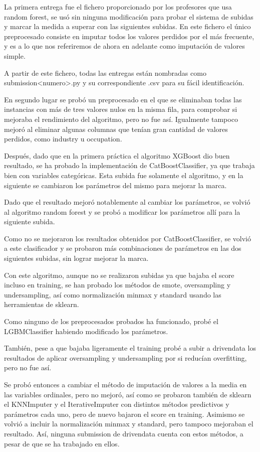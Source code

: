 \documentclass[twoside,openright,titlepage,numbers=noenddot,openany,headinclude,footinclude=true,
cleardoublepage=empty,abstractoff,BCOR=5mm,paper=a4,fontsize=12pt,main=spanish]{scrreprt}
\begin{document}
La primera entrega fue el fichero proporcionado por los profesores que usa random forest, se usó sin ninguna modificación para probar el sistema de subidas y marcar la medida a superar con las siguientes subidas. En este fichero el único preprocesado consiste en imputar todos los valores perdidos por el más frecuente, y es a lo que nos referiremos de ahora en adelante como imputación de valores simple.

A partir de este fichero, todas las entregas están nombradas como submission<numero>.py y su correspondiente .csv para su fácil identificación.

En segundo lugar se probó un preprocesado en el que se eliminaban todas las instancias con más de tres valores nulos en la misma fila, para comprobar si mejoraba el rendimiento del algoritmo, pero no fue así. Igualmente tampoco mejoró al eliminar algunas columnas que tenían gran cantidad de valores perdidos, como industry u occupation.

Después, dado que en la primera práctica el algoritmo XGBoost dio buen resultado, se ha probado la implementación de CatBoostClassifier, ya que trabaja bien con variables categóricas. Esta subida fue solamente el algoritmo, y en la siguiente se cambiaron los parámetros del mismo para mejorar la marca.

Dado que el resultado mejoró notablemente al cambiar los parámetros, se volvió al algoritmo random forest y se probó a modificar los parámetros allí para la siguiente subida.

Como no se mejoraron los resultados obtenidos por CatBoostClassifier, se volvió a este clasificador y se probaron más combinaciones de parámetros en las dos siguientes subidas, sin lograr mejorar la marca.

Con este algoritmo, aunque no se realizaron subidas ya que bajaba el score incluso en training, se han probado los métodos de smote, oversampling y undersampling, así como normalización minmax y standard usando las herramientas de sklearn.

Como ninguno de los preprocesados probados ha funcionado, probé el LGBMClassifier habiendo modificado los parámetros.

También, pese a que bajaba ligeramente el training probé a subir a drivendata los resultados de aplicar oversampling y undersampling por si reducían overfitting, pero no fue así.

Se probó entonces a cambiar el método de imputación de valores a la media en las variables ordinales, pero no mejoró, así como se probaron también de sklearn el KNNImputer y el IterativeImputer con distintos métodos predictivos y parámetros cada uno, pero de nuevo bajaron el score en training. Asimismo se volvió a incluir la normalización minmax y standard, pero tampoco mejoraban el resultado. Así, ninguna submission de drivendata cuenta con estos métodos, a pesar de que se ha trabajado en ellos.
\end{document}
